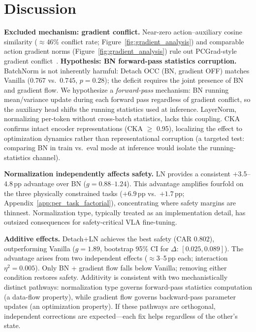 
\section{Discussion}
\label{sec:discussion}

\textbf{Excluded mechanism: gradient conflict.} Near-zero action--auxiliary cosine similarity (${\approx}$46\% conflict rate; Figure~\ref{fig:gradient_analysis}) and comparable action gradient norms (Figure~\ref{fig:gradient_analysis}) rule out PCGrad-style gradient conflict~\cite{yu2020pcgrad}.
%
\textbf{Hypothesis: BN forward-pass statistics corruption.} BatchNorm is not inherently harmful: Detach OCC (BN, gradient OFF) matches Vanilla ($0.767$ vs.\ $0.745$, $p{=}0.28$); the deficit requires the joint presence of BN and gradient flow. We hypothesize a \emph{forward-pass} mechanism: BN running mean/variance update during each forward pass regardless of gradient conflict, so the auxiliary head shifts the running statistics used at inference. LayerNorm, normalizing per-token without cross-batch statistics, lacks this coupling. CKA confirms intact encoder representations (CKA $\geq$ 0.95), localizing the effect to optimization dynamics rather than representational corruption (a targeted test: comparing BN in train vs.\ eval mode at inference would isolate the running-statistics channel).

\textbf{Normalization independently affects safety.} LN provides a consistent $+$3.5--4.8\,pp advantage over BN ($g{=}0.88$--$1.24$). This advantage amplifies fourfold on the three physically constrained tasks ($+6.9$\,pp vs.\ $+1.7$\,pp; Appendix~\ref{app:per_task_factorial}), concentrating where safety margins are thinnest. Normalization type, typically treated as an implementation detail, has outsized consequences for safety-critical VLA fine-tuning.

\textbf{Additive effects.} Detach+LN achieves the best safety (CAR $0.802$), outperforming Vanilla ($g{=}1.89$, bootstrap 95\% CI for $\Delta$: $[0.025, 0.089]$). The advantage arises from two independent effects (${\approx}$3--5\,pp each; interaction $\eta^2{=}0.005$). Only BN + gradient flow falls below Vanilla; removing either condition restores safety. Additivity is consistent with two mechanistically distinct pathways: normalization type governs forward-pass statistics computation (a data-flow property), while gradient flow governs backward-pass parameter updates (an optimization property). If these pathways are orthogonal, independent corrections are expected---each fix helps regardless of the other's state.

